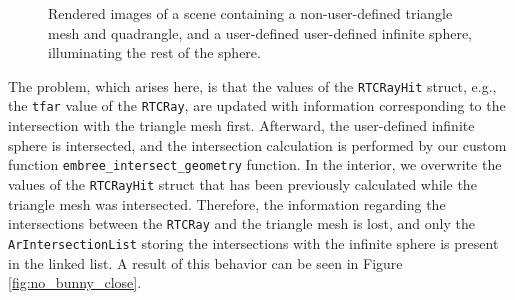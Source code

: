 \begin{figure}[!tbp]
	\centering
	\hfil
	\caption{Rendered images of a scene containing a non-user-defined triangle mesh and quadrangle, and a user-defined user-defined infinite sphere, illuminating the rest of the sphere.}
	\label{fig:no_bunny}
\end{figure}


The problem, which arises here, is that the values of the \texttt{RTCRayHit} struct, e.g., the \texttt{tfar} value of the \texttt{RTCRay}, are updated with information corresponding to the intersection with the triangle mesh first. Afterward, the user-defined infinite sphere is intersected, and the intersection calculation is performed by our custom function \texttt{embree\_intersect\_geometry} function. In the interior, we overwrite the values of the \texttt{RTCRayHit} struct that has been previously calculated while the triangle mesh was intersected. Therefore, the information regarding the intersections between the \texttt{RTCRay} and the triangle mesh is lost, and only the \texttt{ArIntersectionList} storing the intersections with the infinite sphere is present in the linked list. A result of this behavior can be seen in Figure \ref{fig:no_bunny_close}.

